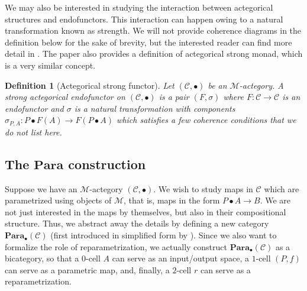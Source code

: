 \documentclass[11pt,a4paper,openright,twoside]{report}
\newcounter{mycounter}
\theoremstyle{plain}
\newtheorem{definition}[mycounter]{Definition}
\theoremstyle{definition}
\begin{document}
We may also be interested in studying the interaction between actegorical structures and endofunctors. This interaction can happen owing to a natural transformation known as strength. We will not provide coherence diagrams in the definition below for the sake of brevity, but the interested reader can find more detail in \cite{gavranovicposition}. The paper also provides a definition of actegorical strong monad, which is a very similar concept.


\begin{definition}[Actegorical strong functor]
  Let $(\mathcal{C}, \bullet)$ be an $\mathcal{M}$-actegory. A strong actegorical endofunctor on $(\mathcal{C}, \bullet)$ is a pair $(F, \sigma)$ where $F: \mathcal{C} \to \mathcal{C}$ is an endofunctor and $\sigma$ is a natural transformation with components $\sigma_{P,A}: P \bullet F(A) \to F(P \bullet A)$ which satisfies a few coherence conditions that we do not list here.
\end{definition}



\subsection{The $\mathbf{Para}$ construction}


Suppose we have an $\mathcal{M}$-actegory $(\mathcal{C}, \bullet)$. We wish to study maps in $\mathcal{C}$ which are parametrized using objects of $\mathcal{M}$, that is, maps in the form $P \bullet A \to B$. We are not just interested in the maps by themselves, but also in their compositional structure. Thus, we abstract away the details by defining a new category $\mathbf{Para}_{\bullet}(\mathcal{C})$ (first introduced in simplified form by \cite{fong2019backprop}). Since we also want to formalize the role of reparametrization, we actually construct $\mathbf{Para}_{\bullet}(\mathcal{C})$ as a bicategory, so that a $0$-cell $A$ can serve as an input/output space, a $1$-cell $(P,f)$ can serve as a parametric map, and, finally, a $2$-cell $r$ can serve as a reparametrization.
\end{document}
